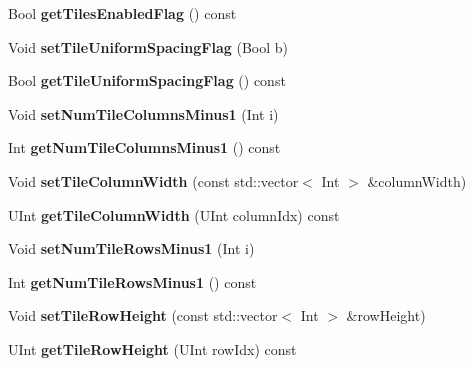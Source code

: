 \begin{DoxyCompactItemize}
Bool {\bfseries get\+Tiles\+Enabled\+Flag} () const
\item 
\mbox{\label{class_t_com_p_p_s_a98dd6ba7b921ae083ffa7049d6b68161}} 
Void {\bfseries set\+Tile\+Uniform\+Spacing\+Flag} (Bool b)
\item 
\mbox{\label{class_t_com_p_p_s_a44e98e7a6325db3176679dca2f13c943}} 
Bool {\bfseries get\+Tile\+Uniform\+Spacing\+Flag} () const
\item 
\mbox{\label{class_t_com_p_p_s_a21f462ba09511cb955db25ef97d441a4}} 
Void {\bfseries set\+Num\+Tile\+Columns\+Minus1} (Int i)
\item 
\mbox{\label{class_t_com_p_p_s_aaa3e7345dab15d266ac9d2d0d3d838bd}} 
Int {\bfseries get\+Num\+Tile\+Columns\+Minus1} () const
\item 
\mbox{\label{class_t_com_p_p_s_a39c4eddc1b377e44ba65acbdeba1188c}} 
Void {\bfseries set\+Tile\+Column\+Width} (const std\+::vector$<$ Int $>$ \&column\+Width)
\item 
\mbox{\label{class_t_com_p_p_s_aa89438569f17d7568bcbd0ccb567905c}} 
U\+Int {\bfseries get\+Tile\+Column\+Width} (U\+Int column\+Idx) const
\item 
\mbox{\label{class_t_com_p_p_s_aec905ede5218aeec2bf1247ec4101650}} 
Void {\bfseries set\+Num\+Tile\+Rows\+Minus1} (Int i)
\item 
\mbox{\label{class_t_com_p_p_s_aee5b821bb97a2ee404b999da0d95a033}} 
Int {\bfseries get\+Num\+Tile\+Rows\+Minus1} () const
\item 
\mbox{\label{class_t_com_p_p_s_a56a16d450f1c1efebf17a10811929e4b}} 
Void {\bfseries set\+Tile\+Row\+Height} (const std\+::vector$<$ Int $>$ \&row\+Height)
\item 
\mbox{\label{class_t_com_p_p_s_a4800072b63d06af92deb0f42fe632e18}} 
U\+Int {\bfseries get\+Tile\+Row\+Height} (U\+Int row\+Idx) const
\item 
\mbox{\label{class_t_com_p_p_s_a291adac85007445608e835a1a1103cbd}} 

\end{DoxyCompactItemize}
